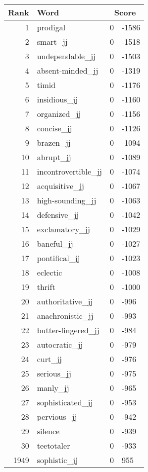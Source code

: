 \begin{longtable}[!htbp]{| rlr@{.}l |}
    \hline
    \textbf{Rank} & \textbf{Word} & \multicolumn{2}{c|}{\textbf{Score}} \\
    \hline
    \endhead
    1 & prodigal & 0 & -1586 \\
    2 & smart\_jj & 0 & -1518 \\
    3 & undependable\_jj & 0 & -1503 \\
    4 & absent-minded\_jj & 0 & -1319 \\
    5 & timid & 0 & -1176 \\
    6 & insidious\_jj & 0 & -1160 \\
    7 & organized\_jj & 0 & -1156 \\
    8 & concise\_jj & 0 & -1126 \\
    9 & brazen\_jj & 0 & -1094 \\
    10 & abrupt\_jj & 0 & -1089 \\
    11 & incontrovertible\_jj & 0 & -1074 \\
    12 & acquisitive\_jj & 0 & -1067 \\
    13 & high-sounding\_jj & 0 & -1063 \\
    14 & defensive\_jj & 0 & -1042 \\
    15 & exclamatory\_jj & 0 & -1029 \\
    16 & baneful\_jj & 0 & -1027 \\
    17 & pontifical\_jj & 0 & -1023 \\
    18 & eclectic & 0 & -1008 \\
    19 & thrift & 0 & -1000 \\
    20 & authoritative\_jj & 0 & -996 \\
    21 & anachronistic\_jj & 0 & -993 \\
    22 & butter-fingered\_jj & 0 & -984 \\
    23 & autocratic\_jj & 0 & -979 \\
    24 & curt\_jj & 0 & -976 \\
    25 & serious\_jj & 0 & -975 \\
    26 & manly\_jj & 0 & -965 \\
    27 & sophisticated\_jj & 0 & -953 \\
    28 & pervious\_jj & 0 & -942 \\
    29 & silence & 0 & -939 \\
    30 & teetotaler & 0 & -933 \\
    1949 & sophistic\_jj & 0 & 955 \\

\end{longtable}
